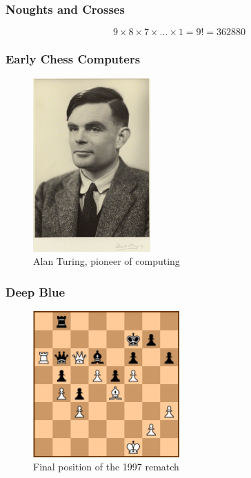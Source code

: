 \documentclass{beamer}
\begin{document}
\begin{frame} %
\frametitle{Noughts and Crosses}
\begin{figure}
	\centering
\end{figure}
$$9\times8\times7\times\ldots\times1 = 9! = 362880$$
\end{frame}

\begin{frame} %
\frametitle{Early Chess Computers}
\begin{figure}
	\centering
	\includegraphics[width=0.4\textwidth]{images/turing.jpg}
	\caption{Alan Turing, pioneer of computing}
	\label{turing}
\end{figure}
\end{frame}

\begin{frame} %
\frametitle{Deep Blue}
\begin{figure}
	\centering
	\includegraphics[width=0.5\textwidth]{images/deep-blue.png}
	\caption{Final position of the 1997 rematch}
	\label{deep-blue}
\end{figure}
\end{frame}
\end{document}
